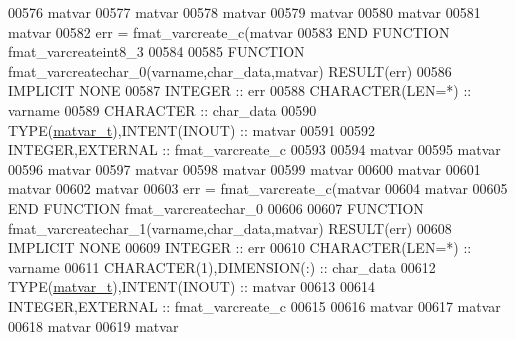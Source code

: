 \begin{DoxyCode}
00576     matvar%
00577     matvar%
00578     matvar%
00579     matvar%
00580     matvar%
00581     matvar%
00582     err = fmat\_varcreate\_c(matvar%
00583 \textcolor{keyword}{END FUNCTION }fmat\_varcreateint8\_3
00584 
00585 \textcolor{keyword}{FUNCTION }fmat\_varcreatechar\_0(varname,char\_data,matvar) \textcolor{keyword}{RESULT}(err)
00586 \textcolor{keywordtype}{IMPLICIT NONE}
00587     \textcolor{keywordtype}{INTEGER}                         :: err
00588     \textcolor{keywordtype}{CHARACTER(LEN=*)}                :: varname
00589     \textcolor{keywordtype}{CHARACTER}                       :: char\_data
00590     \textcolor{keywordtype}{TYPE}(\hyperlink{group___m_a_t_structmatvar__t}{matvar\_t}),\textcolor{keywordtype}{INTENT(INOUT)}    :: matvar
00591 
00592     \textcolor{keywordtype}{INTEGER},\textcolor{keywordtype}{EXTERNAL}                :: fmat\_varcreate\_c
00593 
00594     matvar%
00595     matvar%
00596     matvar%
00597     matvar%
00598     matvar%
00599     matvar%
00600     matvar%
00601     matvar%
00602     matvar%
00603     err = fmat\_varcreate\_c(matvar%
00604                            matvar%
00605 \textcolor{keyword}{END FUNCTION }fmat\_varcreatechar\_0
00606 
00607 \textcolor{keyword}{FUNCTION }fmat\_varcreatechar\_1(varname,char\_data,matvar) \textcolor{keyword}{RESULT}(err)
00608 \textcolor{keywordtype}{IMPLICIT NONE}
00609     \textcolor{keywordtype}{INTEGER}                         :: err
00610     \textcolor{keywordtype}{CHARACTER(LEN=*)}                :: varname
00611     \textcolor{keywordtype}{CHARACTER(1)},\textcolor{keywordtype}{DIMENSION(:)}       :: char\_data
00612     \textcolor{keywordtype}{TYPE}(\hyperlink{group___m_a_t_structmatvar__t}{matvar\_t}),\textcolor{keywordtype}{INTENT(INOUT)}    :: matvar
00613 
00614     \textcolor{keywordtype}{INTEGER},\textcolor{keywordtype}{EXTERNAL}                :: fmat\_varcreate\_c
00615 
00616     matvar%
00617     matvar%
00618     matvar%
00619     matvar%

\end{DoxyCode}
